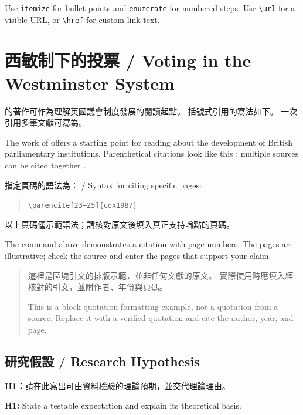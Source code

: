 \documentclass[11pt,a4paper]{article}
\begin{document}
Use \texttt{itemize} for bullet points and \texttt{enumerate} for numbered steps. Use \texttt{\textbackslash url} for a visible URL, or \texttt{\textbackslash href} for custom link text.

\section{西敏制下的投票 / Voting in the Westminster System}
\label{sec:theory}
\textcite{cox1987}的著作可作為理解英國議會制度發展的閱讀起點。
括號式引用的寫法如下\parencite{cox1987}。
一次引用多筆文獻可寫為\parencite{cox1987,carey2009}。

The work of \textcite{cox1987} offers a starting point for reading about the development of British parliamentary institutions. Parenthetical citations look like this \parencite{cox1987}; multiple sources can be cited together \parencite{cox1987,carey2009}.

指定頁碼的語法為： / Syntax for citing specific pages:
\begin{quote}
\texttt{\textbackslash{}parencite[23--25]\{cox1987\}}
\end{quote}
以上頁碼僅示範語法；請核對原文後填入真正支持論點的頁碼。

The command above demonstrates a citation with page numbers. The pages are illustrative; check the source and enter the pages that support your claim.

\begin{quote}
這裡是區塊引文的排版示範，並非任何文獻的原文。
實際使用時應填入經核對的引文，並附作者、年份與頁碼。

\par This is a block quotation formatting example, not a quotation from a source. Replace it with a verified quotation and cite the author, year, and page.
\end{quote}

\subsection{研究假設 / Research Hypothesis}
\textbf{H1：}請在此寫出可由資料檢驗的理論預期，並交代理論理由。

\textbf{H1:} State a testable expectation and explain its theoretical basis.
\end{document}
